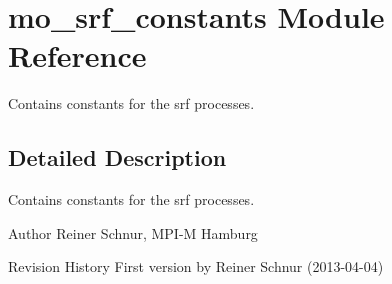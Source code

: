 \hypertarget{namespacemo__srf__constants}{}\section{mo\+\_\+srf\+\_\+constants Module Reference}
\label{namespacemo__srf__constants}


Contains constants for the srf processes.  




\subsection{Detailed Description}
Contains constants for the srf processes. 

\begin{DoxyAuthor}{Author}
Reiner Schnur, M\+P\+I-\/\+M Hamburg
\end{DoxyAuthor}
\begin{DoxyParagraph}{Revision History}
First version by Reiner Schnur (2013-\/04-\/04) 
\end{DoxyParagraph}
